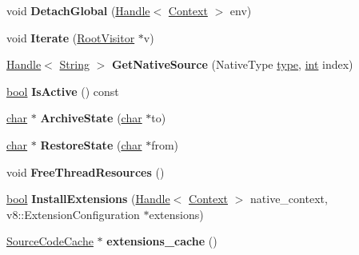 \begin{DoxyCompactItemize}
\item 
\mbox{\label{classv8_1_1internal_1_1Bootstrapper_a2aa410105a62de50a1dbc1e045b001e0}} 
void {\bfseries Detach\+Global} (\mbox{\hyperlink{classv8_1_1internal_1_1Handle}{Handle}}$<$ \mbox{\hyperlink{classv8_1_1internal_1_1Context}{Context}} $>$ env)
\item 
\mbox{\label{classv8_1_1internal_1_1Bootstrapper_a77b06d99a057efab5907ede55ae4ca7e}} 
void {\bfseries Iterate} (\mbox{\hyperlink{classv8_1_1internal_1_1RootVisitor}{Root\+Visitor}} $\ast$v)
\item 
\mbox{\label{classv8_1_1internal_1_1Bootstrapper_abc0e666caa86a0a921ddcdf3d87a4a87}} 
\mbox{\hyperlink{classv8_1_1internal_1_1Handle}{Handle}}$<$ \mbox{\hyperlink{classv8_1_1internal_1_1String}{String}} $>$ {\bfseries Get\+Native\+Source} (Native\+Type \mbox{\hyperlink{classstd_1_1conditional_1_1type}{type}}, \mbox{\hyperlink{classint}{int}} index)
\item 
\mbox{\label{classv8_1_1internal_1_1Bootstrapper_a2ed96a283695ebb5718bfa6922f489d1}} 
\mbox{\hyperlink{classbool}{bool}} {\bfseries Is\+Active} () const
\item 
\mbox{\label{classv8_1_1internal_1_1Bootstrapper_ae9807d1ed391e6bf63f822622568bdf9}} 
\mbox{\hyperlink{classchar}{char}} $\ast$ {\bfseries Archive\+State} (\mbox{\hyperlink{classchar}{char}} $\ast$to)
\item 
\mbox{\label{classv8_1_1internal_1_1Bootstrapper_a09e5063ba2fb10e54d55780cbf8dd761}} 
\mbox{\hyperlink{classchar}{char}} $\ast$ {\bfseries Restore\+State} (\mbox{\hyperlink{classchar}{char}} $\ast$from)
\item 
\mbox{\label{classv8_1_1internal_1_1Bootstrapper_a7a9f0a465b7af7f35684b12bfc16c29d}} 
void {\bfseries Free\+Thread\+Resources} ()
\item 
\mbox{\label{classv8_1_1internal_1_1Bootstrapper_ad7c7e8c0886019b2c032d9d9cde5f835}} 
\mbox{\hyperlink{classbool}{bool}} {\bfseries Install\+Extensions} (\mbox{\hyperlink{classv8_1_1internal_1_1Handle}{Handle}}$<$ \mbox{\hyperlink{classv8_1_1internal_1_1Context}{Context}} $>$ native\+\_\+context, v8\+::\+Extension\+Configuration $\ast$extensions)
\item 
\mbox{\label{classv8_1_1internal_1_1Bootstrapper_a551ccd9e8436e6325522834e16e03b6d}} 
\mbox{\hyperlink{classv8_1_1internal_1_1SourceCodeCache}{Source\+Code\+Cache}} $\ast$ {\bfseries extensions\+\_\+cache} ()
\end{DoxyCompactItemize}
